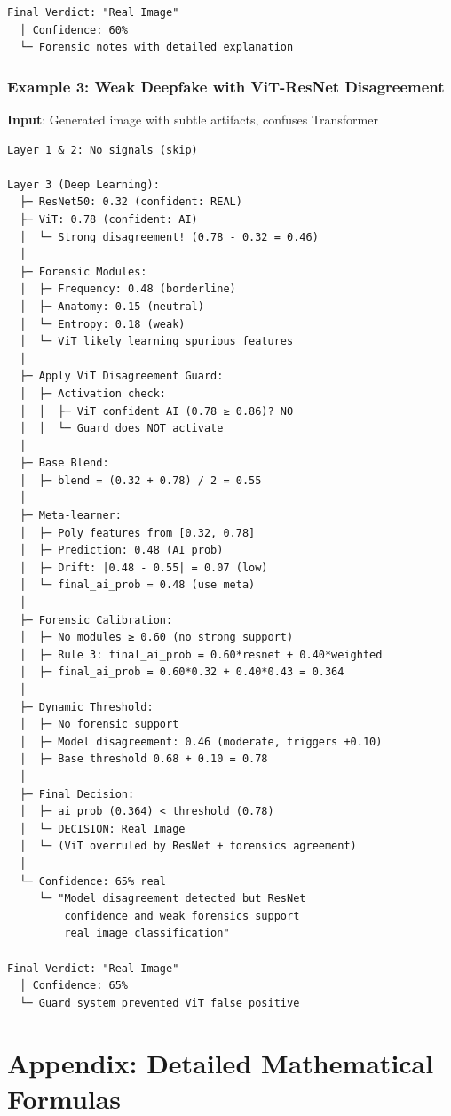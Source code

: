 \documentclass[12pt,a4paper]{book}
\begin{document}
\begin{itemize}
\begin{verbatim}
Final Verdict: "Real Image"
  │ Confidence: 60%
  └─ Forensic notes with detailed explanation
\end{verbatim}

\subsection{Example 3: Weak Deepfake with ViT-ResNet Disagreement}

\textbf{Input}: Generated image with subtle artifacts, confuses Transformer

\begin{verbatim}
Layer 1 & 2: No signals (skip)

Layer 3 (Deep Learning):
  ├─ ResNet50: 0.32 (confident: REAL)
  ├─ ViT: 0.78 (confident: AI)
  │  └─ Strong disagreement! (0.78 - 0.32 = 0.46)
  │
  ├─ Forensic Modules:
  │  ├─ Frequency: 0.48 (borderline)
  │  ├─ Anatomy: 0.15 (neutral)
  │  └─ Entropy: 0.18 (weak)
  │  └─ ViT likely learning spurious features
  │
  ├─ Apply ViT Disagreement Guard:
  │  ├─ Activation check:
  │  │  ├─ ViT confident AI (0.78 ≥ 0.86)? NO
  │  │  └─ Guard does NOT activate
  │
  ├─ Base Blend:
  │  ├─ blend = (0.32 + 0.78) / 2 = 0.55
  │
  ├─ Meta-learner:
  │  ├─ Poly features from [0.32, 0.78]
  │  ├─ Prediction: 0.48 (AI prob)
  │  ├─ Drift: |0.48 - 0.55| = 0.07 (low)
  │  └─ final_ai_prob = 0.48 (use meta)
  │
  ├─ Forensic Calibration:
  │  ├─ No modules ≥ 0.60 (no strong support)
  │  ├─ Rule 3: final_ai_prob = 0.60*resnet + 0.40*weighted
  │  ├─ final_ai_prob = 0.60*0.32 + 0.40*0.43 = 0.364
  │
  ├─ Dynamic Threshold:
  │  ├─ No forensic support
  │  ├─ Model disagreement: 0.46 (moderate, triggers +0.10)
  │  ├─ Base threshold 0.68 + 0.10 = 0.78
  │
  ├─ Final Decision:
  │  ├─ ai_prob (0.364) < threshold (0.78)
  │  └─ DECISION: Real Image
  │  └─ (ViT overruled by ResNet + forensics agreement)
  │
  └─ Confidence: 65% real
     └─ "Model disagreement detected but ResNet
         confidence and weak forensics support
         real image classification"

Final Verdict: "Real Image"
  │ Confidence: 65%
  └─ Guard system prevented ViT false positive
\end{verbatim}

\appendix

\chapter{Appendix: Detailed Mathematical Formulas}
\label{app:formulas}


\end{itemize}
\end{document}

